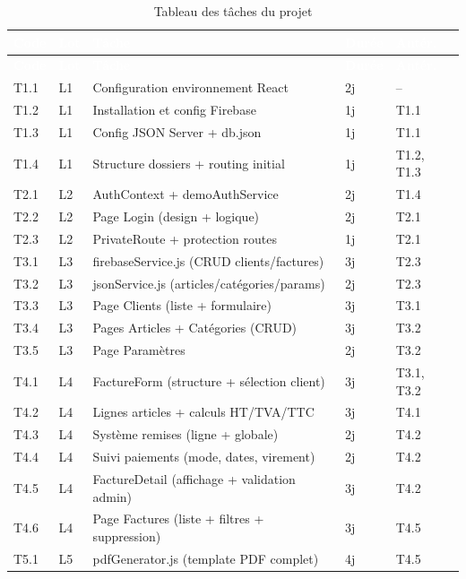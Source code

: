 \documentclass[12pt,a4paper]{report}
\begin{document}
\begin{longtable}{|l|l|X|l|l|}
\caption{Tableau des tâches du projet} \label{tab:taches} \\
\hline
\rowcolor{emsiblue}\textcolor{white}{\textbf{Code}} & \textcolor{white}{\textbf{Lot}} & \textcolor{white}{\textbf{Tâche}} & \textcolor{white}{\textbf{Durée}} & \textcolor{white}{\textbf{Antér.}} \\
\hline
\endfirsthead
\hline
\rowcolor{emsiblue}\textcolor{white}{\textbf{Code}} & \textcolor{white}{\textbf{Lot}} & \textcolor{white}{\textbf{Tâche}} & \textcolor{white}{\textbf{Durée}} & \textcolor{white}{\textbf{Antér.}} \\
\hline
\endhead
T1.1 & L1 & Configuration environnement React & 2j & -- \\
T1.2 & L1 & Installation et config Firebase & 1j & T1.1 \\
T1.3 & L1 & Config JSON Server + db.json & 1j & T1.1 \\
T1.4 & L1 & Structure dossiers + routing initial & 1j & T1.2, T1.3 \\
T2.1 & L2 & AuthContext + demoAuthService & 2j & T1.4 \\
T2.2 & L2 & Page Login (design + logique) & 2j & T2.1 \\
T2.3 & L2 & PrivateRoute + protection routes & 1j & T2.1 \\
T3.1 & L3 & firebaseService.js (CRUD clients/factures) & 3j & T2.3 \\
T3.2 & L3 & jsonService.js (articles/catégories/params) & 2j & T2.3 \\
T3.3 & L3 & Page Clients (liste + formulaire) & 3j & T3.1 \\
T3.4 & L3 & Pages Articles + Catégories (CRUD) & 3j & T3.2 \\
T3.5 & L3 & Page Paramètres & 2j & T3.2 \\
T4.1 & L4 & FactureForm (structure + sélection client) & 3j & T3.1, T3.2 \\
T4.2 & L4 & Lignes articles + calculs HT/TVA/TTC & 3j & T4.1 \\
T4.3 & L4 & Système remises (ligne + globale) & 2j & T4.2 \\
T4.4 & L4 & Suivi paiements (mode, dates, virement) & 2j & T4.2 \\
T4.5 & L4 & FactureDetail (affichage + validation admin) & 3j & T4.2 \\
T4.6 & L4 & Page Factures (liste + filtres + suppression) & 3j & T4.5 \\
T5.1 & L5 & pdfGenerator.js (template PDF complet) & 4j & T4.5 \\

\end{longtable}
\end{document}
